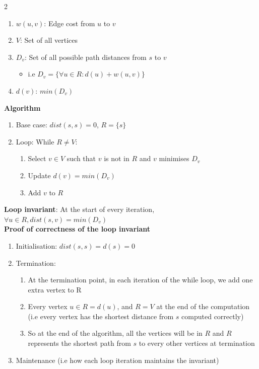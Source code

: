 \documentclass[10pt,landscape]{article}
\begin{document}
\begin{multicols*}{2}
\begin{enumerate}
    \item $w(u, v)$: Edge cost from $u$ to $v$
    \item $V$: Set of all vertices
    \item $D_v$: Set of all possible path distances from $s$ to $v$ 
        \begin{itemize}
            \item i.e $D_v = \{\forall u \in R : d(u) + w(u, v)\}$
        \end{itemize}
    \item $d(v)$: $min(D_v)$
\end{enumerate}
\vspace{8pt}
\textbf{Algorithm}
\begin{enumerate}
    \item Base case: $dist(s,s) = 0$, $R = \{s\}$
    \item Loop: While $R \neq V$:
        \begin{enumerate}
            \item Select $v \in V$ such that $v$ is not in $R$ and $v$ minimises $D_v$
            \item Update $d(v) = min(D_v)$
            \item Add $v$ to $R$
        \end{enumerate}
\end{enumerate}
\vspace{8pt}
\textbf{Loop invariant}: At the start of every iteration, $\forall u \in R, dist(s, v) = min(D_v)$
\vspace{8pt} \\
\textbf{Proof of correctness of the loop invariant}
\begin{enumerate}
    \item Initialisation: $dist(s, s) = d(s) = 0$
    \item Termination: 
        \begin{enumerate}
            \item At the termination point, in each iteration of the while loop, we add one extra vertex to R
            \item Every vertex $u \in R = d(u)$, and $R = V$ at the end of the computation (i.e every vertex has the shortest distance from $s$ computed correctly)
            \item So at the end of the algorithm, all the vertices will be in $R$ and $R$ represents the shortest path from $s$ to every other vertices at termination
        \end{enumerate}
    \item Maintenance (i.e how each loop iteration maintains the invariant)

\end{enumerate}
\end{multicols*}
\end{document}
